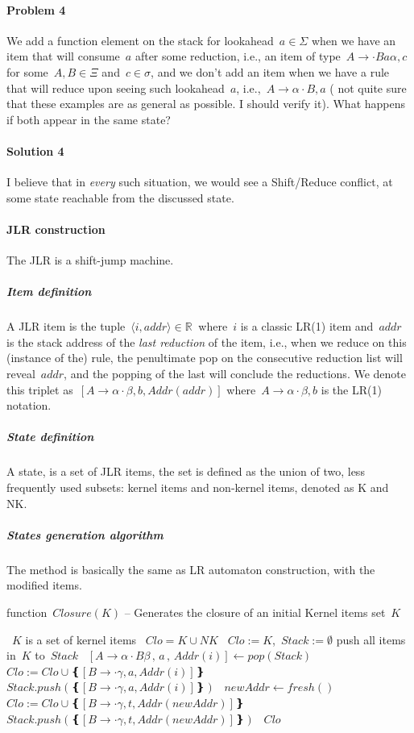 \paragraph{Problem 4} We add a function element on the stack for lookahead~$a∈Σ$
  when we have an item that will consume~$a$ after some reduction,
  i.e., an item of type~$A→·Baα,c$ for some~$A,B∈Ξ$ and~$c∈σ$,
  and we don't add an item when we have a rule that will reduce
  upon seeing such lookahead~$a$, i.e.,~$A→α·B , a$
  ( not quite sure that these examples are as general as possible. I should verify it).
  What happens if both appear in the same state?

\paragraph{Solution 4} I believe that in \emph{every} such situation,
  we would see a Shift/Reduce conflict, at some state reachable from the discussed state.

\paragraph*{JLR construction}
The JLR is a shift-jump machine.

\subparagraph*{Item definition}
A JLR item is the tuple~$⟨i,addr⟩∈ℝ~$
  where~$i$ is a classic LR(1) item
  and~$addr$ is the stack address of the \emph{last reduction} of the item, i.e.,
  when we reduce on this (instance of the) rule,
  the penultimate pop on the consecutive reduction
  list will reveal~$addr$, and the popping of the last
  will conclude the reductions.
We denote this triplet as~$[A→α·β, b , Addr(addr)]$
  where~$A→α·β, b$ is the LR(1) notation.

\subparagraph*{State definition}
A state, is a set of JLR items, the set is defined as the
  union of two, less frequently used subsets:
  kernel items and non-kernel items, denoted
  as \textsf{K} and \textsf{NK}.

\subparagraph*{States generation algorithm}
The method is basically the same as LR automaton construction,
  with the modified items.

  \begin{algorithm}[p]
  \caption{\label{Algorithm:Closure}
  function~$Closure(K)$ -- Generates the closure of an initial \textsf{Kernel} items set~$K$}
  \begin{algorithmic}
    \REQUIRE~$K$ is a set of kernel items
    \ENSURE~$Clo = K ∪ NK$
    \STATE~$Clo := K$,~$Stack :=∅$
    \STATE push all items in~$K$ to~$Stack$
      \STATE~$ [ A→α·Bβ \, , \, a \, , \, Addr(i) ]←pop(Stack)$
        \STATE~$Clo := Clo ∪ ❴ [ B→·γ, a , Addr(i) ] ❵$
        \STATE~$Stack.push(❴ [ B→·γ, a , Addr(i) ] ❵)$
      \ENDIF
      \STATE~$newAddr←fresh()$
          \STATE~$Clo := Clo ∪ ❴ [ B→·γ, t , Addr(newAddr) ] ❵$
          \STATE~$Stack.push(❴ [ B→·γ, t , Addr(newAddr) ] ❵)$
        \ENDFOR
      \ENDFOR
    \ENDWHILE
    \RETURN~$Clo$
  \end{algorithmic}
\end{algorithm}

